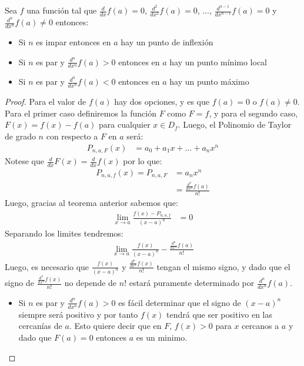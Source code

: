 \documentclass[12pt,a4paper,oneside]{memoir}
\begin{document}
\begin{theorem}
    Sea $f$ una función tal que $\frac{d}{dx} f(a) = 0$, $\frac{d^2}{dx^2} f(a) = 0$, $\dots$, $\frac{d^{n-1}}{dx^{n-1}} f(a) = 0$ y $\frac{d^n}{dx^n} f(a) \neq 0$ entonces:
    \begin{itemize}
        \item Si $n$ es impar entonces en $a$ hay un punto de inflexión
        \item Si $n$ es par y $\frac{d^n}{dx^n} f(a) > 0$ entonces en $a$ hay un punto mínimo local
        \item Si $n$ es par y $\frac{d^n}{dx^n} f(a) < 0$ entonces en $a$ hay un punto máximo
    \end{itemize}  
\end{theorem}
\begin{proof}
    Para el valor de $f(a)$ hay dos opciones, y es que $f(a) = 0$ o $f(a) \neq 0$. Para el primer caso definiremos la función $F$ como $F = f$, y para el segundo caso, $F(x) = f(x) - f(a)$ para cualquier $x \in D_f$. Luego, el Polinomio de Taylor de grado $n$ con respecto a $F$ en $a$ será:
    \begin{align*}
        P_{n, a, F}(x) &= a_0 + a_1x + \dots + a_nx^n
    \end{align*}
    Notese que $\frac{d}{dx} F(x) = \frac{d}{dx} f(x)$ por lo que:
    \begin{align*}
        P_{n, a, f}(x) = P_{n, a, F} &= a_nx^n\\
        &= \frac{\frac{d^n}{dx^n} f(a)}{n!}
    \end{align*}
    Luego, gracias al teorema anterior sabemos que:
    \begin{align*}
        \lim_{x \to a} \frac{f(x) - P_{n, a, f}}{(x-a)^n} &= 0
    \end{align*}
    Separando los limites tendremos:
    \begin{align*}
        \lim_{x \to a} \frac{f(x)}{(x-a)^n} - \frac{\frac{d^n}{dx^n} f(a)}{n!}
    \end{align*}
    Luego, es necesario que $ \frac{f(x)}{(x-a)^n}$ y $\frac{\frac{d^n}{dx^n} f(x)}{n!}$ tengan el mismo signo, y dado que el signo de $\frac{\frac{d^n}{dx^n} f(x)}{n!}$ no depende de $n!$ estará puramente determinado por $\frac{d^n}{dx^n}f(a)$.
    \begin{itemize}
        \item Si $n$ es par y $\frac{d^n}{dx^n} f(a) > 0$ es fácil determinar que el signo de $(x-a)^n$ siempre será positivo y por tanto $f(x)$ tendrá que ser positivo en las cercanías de $a$. Esto quiere decir que en $F$, $f(x) > 0$ para $x$ cercanos a $a$ y dado que $F(a) = 0$ entonces $a$ es un minimo.

\end{itemize}
\end{proof}
\end{document}
